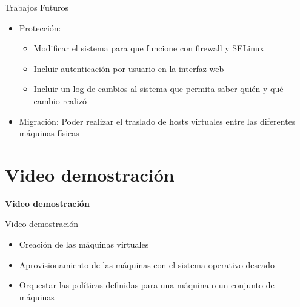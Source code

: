 \begin{frame}{Trabajos Futuros}
    \vspace{0cm}
    \begin{itemize}
        \item Protección: 
        \begin{itemize}
            \item  Modificar el sistema para que funcione con firewall y SELinux
            \item  Incluir autenticación por usuario en la interfaz web
            \item  Incluir un log de cambios al sistema que permita saber quién y qué cambio realizó
        \end{itemize}
        \item Migración: Poder realizar el traslado de hosts virtuales entre las diferentes máquinas físicas
        
    \end{itemize}

\end{frame}

\section{Video demostración}
\begin{frame}
    \Huge
    \centering
    \textbf{Video demostración}

\end{frame}

\begin{frame}{Video demostración}
    \vspace{-1.5cm}
    \begin{itemize}
        \item Creación de las máquinas virtuales
        \item Aprovisionamiento de las máquinas con el sistema operativo deseado
        \item Orquestar las políticas definidas para una máquina o un conjunto de máquinas
    \end{itemize}

\end{frame}

